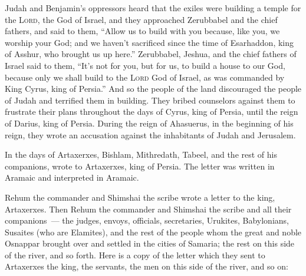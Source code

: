 
\begin{inparaenum}
   Judah and Benjamin's oppressors heard that the exiles were building a temple for the \textsc{Lord}, the God of Israel,%
   and they approached Zerubbabel and the chief fathers, and said to them, ``Allow us to build with you because, like you, we worship your God; and we haven't sacrificed since the time of Esarhaddon, king of Asshur, who brought us up here.''%
   Zerubbabel, Jeshua, and the chief fathers of Israel said to them, ``It's not for you, but for us, to build a house to our God, because only we shall build to the \textsc{Lord} God of Israel, as was commanded by King Cyrus, king of Persia.''%
   And so the people of the land discouraged the people of Judah and terrified them in building.%
   They bribed counselors against them to frustrate their plans throughout the days of Cyrus, king of Persia, until the reign of Darius, king of Persia.%
   During the reign of Ahasuerus, in the beginning of his reign, they wrote an accusation against the inhabitants of Judah and Jerusalem.%
  
   In the days of Artaxerxes, Bishlam, Mithredath, Tabeel, and the rest of his companions, wrote to Artaxerxes, king of Persia. The letter was written in Aramaic and interpreted in Aramaic.%
  
   Rehum the commander and Shimshai the scribe wrote a letter to the king, Artaxerxes.%
   Then Rehum the commander and Shimshai the scribe and all their companions~--- the judges, envoys, officials, secretaries, Urukites, Babylonians, Susaites (who are Elamites),%
   and the rest of the people whom the great and noble Osnappar brought over and settled in the cities of Samaria; the rest on this side of the river, and so forth.%
   Here is a copy of the letter which they sent to Artaxerxes the king, the servants, the men on this side of the river, and so on:%
  

\end{inparaenum}
